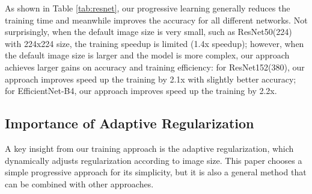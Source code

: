 \documentclass{article}
\begin{document}
\begin{table}[!h]
    \vskip -0.1in
    \centering
    \caption{
        Progressive learning for ResNets and EfficientNets -- (224) and (380) denote inference image size. Our progressive training improves both accuracy and training time for all networks.
       }
    \label{tab:resnet}
\end{table} 
As shown in Table \ref{tab:resnet}, our progressive learning generally reduces the training time and meanwhile improves the accuracy for all different networks. Not surprisingly, when the default image size is very small, such as ResNet50(224) with 224x224  size, the training speedup is limited (1.4x speedup); however, when the default image size is larger and the model is more complex, our approach achieves larger gains on accuracy and training efficiency: for ResNet152(380), our approach improves speed up the training by 2.1x with slightly better accuracy;  for EfficientNet-B4, our approach improves speed up the training by 2.2x.


\subsection{Importance of Adaptive Regularization}

A key insight from our training approach is the adaptive regularization, which dynamically adjusts regularization according to image size. This paper chooses a simple progressive approach for its simplicity, but it is also a general method that can be combined with other approaches.
\end{document}
